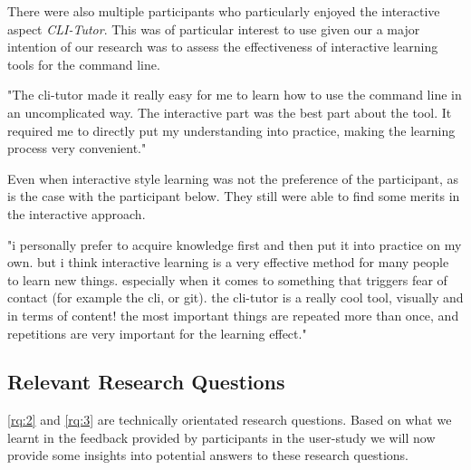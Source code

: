 There were also multiple participants who particularly enjoyed the interactive
aspect \textit{CLI-Tutor}. This was of particular interest to use given our a
major intention of our research was to assess the effectiveness of interactive
learning tools for the command line.

\begin{quotes}
    "The cli-tutor made it really easy for me to learn how to use the command line
    in an uncomplicated way. The interactive part was the best part about the tool.
    It required me to directly put my understanding into practice, making the
    learning process very convenient."
\end{quotes}

Even when interactive style learning was not the preference of the participant,
as is the case with the participant below. They still were able to find some
merits in the interactive approach.

\begin{quotes}
    "i personally prefer to acquire knowledge first and then put it into practice on my own. but i
    think interactive learning is a very effective method for many people to learn new things.
    especially when it comes to something that triggers fear of contact (for example the cli, or git).
    the cli-tutor is a really cool tool, visually and in terms of content! the most important things are
    repeated more than once, and repetitions are very important for the learning effect."
\end{quotes}

\subsection{Relevant Research Questions}

\ref{rq:2} and \ref{rq:3} are technically orientated research questions. Based
on what we learnt in the feedback provided by participants in the user-study we
will now provide some insights into potential answers to these research questions.



                                                                                         


